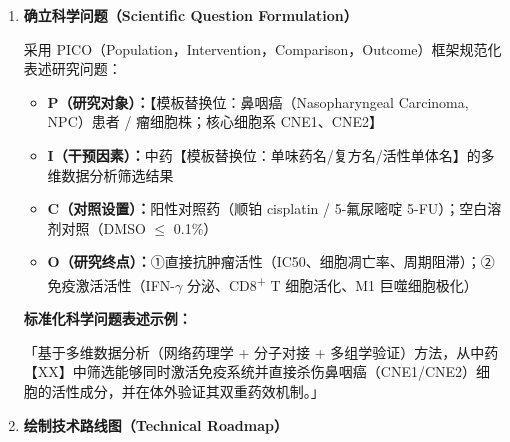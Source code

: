 \documentclass[12pt,a4paper,twoside]{article}
\begin{document}
\begin{enumerate}
  \item \textbf{确立科学问题（Scientific Question Formulation）}

    采用 PICO（Population，Intervention，Comparison，Outcome）框架规范化表述研究问题：
    \begin{itemize}
      \item \textbf{P（研究对象）：}【模板替换位：鼻咽癌（Nasopharyngeal Carcinoma, NPC）患者 / 瘤细胞株；核心细胞系 CNE1、CNE2】
      \item \textbf{I（干预因素）：}中药【模板替换位：单味药名/复方名/活性单体名】的多维数据分析筛选结果
      \item \textbf{C（对照设置）：}阳性对照药（顺铂 cisplatin / 5-氟尿嘧啶 5-FU）；空白溶剂对照（DMSO $\leq$ 0.1\%）
      \item \textbf{O（研究终点）：}①直接抗肿瘤活性（IC50、细胞凋亡率、周期阻滞）；②免疫激活活性（IFN-$\gamma$ 分泌、CD8\textsuperscript{+} T 细胞活化、M1 巨噬细胞极化）
    \end{itemize}

    \textbf{标准化科学问题表述示例：}
    \begin{greenbox}
    「基于多维数据分析（网络药理学 + 分子对接 + 多组学验证）方法，从中药【XX】中筛选能够同时激活免疫系统并直接杀伤鼻咽癌（CNE1/CNE2）细胞的活性成分，并在体外验证其双重药效机制。」
    \end{greenbox}

  \item \textbf{绘制技术路线图（Technical Roadmap）}


\end{enumerate}
\end{document}
